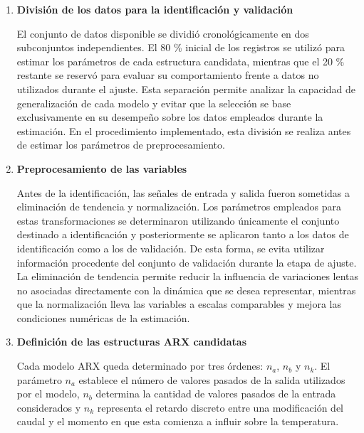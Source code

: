 \documentclass[11pt]{report}
\begin{document}
\begin{enumerate}
    \item \textbf{División de los datos para la identificación y validación}

    El conjunto de datos disponible se dividió cronológicamente en dos subconjuntos independientes. El 80 \% inicial de los registros se utilizó para estimar los parámetros de cada estructura candidata, mientras que el 20 \% restante se reservó para evaluar su comportamiento frente a datos no utilizados durante el ajuste. Esta separación permite analizar la capacidad de generalización de cada modelo y evitar que la selección se base exclusivamente en su desempeño sobre los datos empleados durante la estimación. En el procedimiento implementado, esta división se realiza antes de estimar los parámetros de preprocesamiento.

    

    \item \textbf{Preprocesamiento de las variables}

    Antes de la identificación, las señales de entrada y salida fueron sometidas a eliminación de tendencia y normalización. Los parámetros empleados para estas transformaciones se determinaron utilizando únicamente el conjunto destinado a identificación y posteriormente se aplicaron tanto a los datos de identificación como a los de validación. De esta forma, se evita utilizar información procedente del conjunto de validación durante la etapa de ajuste. La eliminación de tendencia permite reducir la influencia de variaciones lentas no asociadas directamente con la dinámica que se desea representar, mientras que la normalización lleva las variables a escalas comparables y mejora las condiciones numéricas de la estimación.

    \item \textbf{Definición de las estructuras ARX candidatas}

    Cada modelo ARX queda determinado por tres órdenes: $n_{a}$, $n_{b}$ y $n_{k}$. El parámetro $n_{a}$ establece el número de valores pasados de la salida utilizados por el modelo, $n_{b}$ determina la cantidad de valores pasados de la entrada considerados y $n_{k}$ representa el retardo discreto entre una modificación del caudal y el momento en que esta comienza a influir sobre la temperatura.


\end{enumerate}
\end{document}
